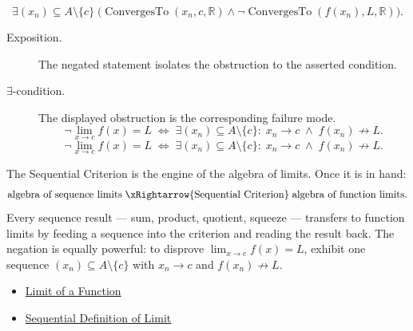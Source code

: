 \begin{remark*}
\[
  \exists (x_n) \subseteq A \setminus \{c\}\;
  \bigl(\operatorname{ConvergesTo}(x_n,c,\mathbb{R})
  \wedge \neg\operatorname{ConvergesTo}(f(x_n),L,\mathbb{R})\bigr).
\]
\end{remark*}

\begin{remark*}
\begin{description}
  \item[Exposition.]
  The negated statement isolates the obstruction to the asserted condition.

  \item[\(\exists\)-condition.]
  The displayed obstruction is the corresponding failure mode.
  \[
\neg\lim_{x\to c}f(x)=L
  \;\iff\;
  \exists (x_n) \subseteq A \setminus \{c\} :\;
  x_n \to c \;\wedge\; f(x_n) \not\to L.
  \]
  \[
\neg\lim_{x\to c}f(x)=L
  \;\iff\;
  \exists (x_n) \subseteq A \setminus \{c\} :\;
  x_n \to c \;\wedge\; f(x_n) \not\to L.
  \]
\end{description}
\end{remark*}



\begin{remark*}[Interpretation]
The Sequential Criterion is the engine of the algebra of limits.
Once it is in hand:
\[
  \text{algebra of sequence limits}
  \;\xRightarrow{\text{Sequential Criterion}}\;
  \text{algebra of function limits.}
\]
Every sequence result --- sum, product, quotient, squeeze --- transfers
to function limits by feeding a sequence into the criterion and
reading the result back. The negation is equally powerful: to
disprove $\lim_{x\to c}f(x)=L$, exhibit one sequence
$(x_n) \subseteq A \setminus \{c\}$ with $x_n \to c$ and
$f(x_n) \not\to L$.
\end{remark*}

\begin{dependencies}
\begin{itemize}
  \item \hyperref[def:limit-function]{Limit of a Function}
  \item \hyperref[def:limit-function-sequential]{Sequential Definition of Limit}
\end{itemize}
\end{dependencies}


